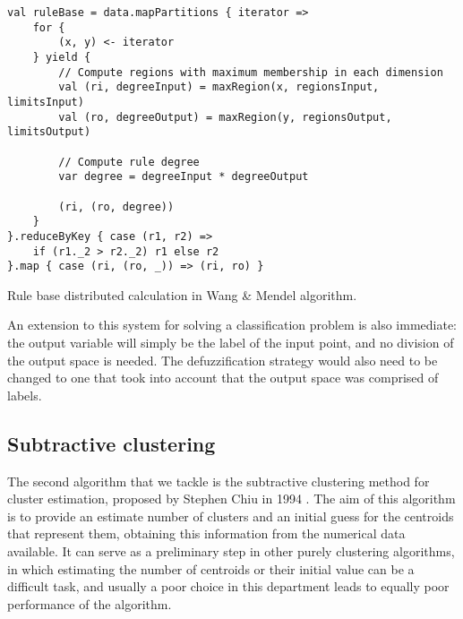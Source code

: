 \begin{Listing}[h!]
\begin{lstlisting}[basicstyle=\normalsize\ttfamily, xleftmargin=.5cm, aboveskip=0em, belowskip=0em]
val ruleBase = data.mapPartitions { iterator =>
    for {
        (x, y) <- iterator
    } yield {
        // Compute regions with maximum membership in each dimension
        val (ri, degreeInput) = maxRegion(x, regionsInput, limitsInput)
        val (ro, degreeOutput) = maxRegion(y, regionsOutput, limitsOutput)

        // Compute rule degree
        var degree = degreeInput * degreeOutput

        (ri, (ro, degree))
    }
}.reduceByKey { case (r1, r2) =>
    if (r1._2 > r2._2) r1 else r2
}.map { case (ri, (ro, _)) => (ri, ro) }
\end{lstlisting}
\caption{Rule base distributed calculation in Wang \& Mendel algorithm.}
  \label{lst:wm}
\end{Listing}

An extension to this system for solving a classification problem is also immediate: the output variable will simply be the label of the input point, and no division of the output space is needed. The defuzzification strategy would also need to be changed to one that took into account that the output space was comprised of labels.

\subsection{Subtractive clustering}

The second algorithm that we tackle is the subtractive clustering method for cluster estimation, proposed by Stephen Chiu in 1994 \cite{chiu1994identification}. The aim of this algorithm is to provide an estimate number of clusters and an initial guess for the centroids that represent them, obtaining this information from the numerical data available. It can serve as a preliminary step in other purely clustering algorithms, in which estimating the number of centroids or their initial value can be a difficult task, and usually a poor choice in this department leads to equally poor performance of the algorithm.

